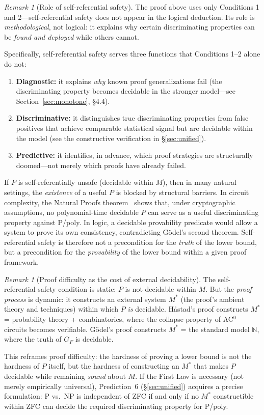 \documentclass[11pt,a4paper]{article}
\theoremstyle{plain}
\theoremstyle{definition}
\theoremstyle{remark}
\newtheorem{remark}[theorem]{Remark}
\begin{document}
\begin{remark}[Role of self-referential safety]
The proof above uses only Conditions 1 and 2---self-referential safety does not appear in the logical deduction. Its role is \emph{methodological}, not logical: it explains why certain discriminating properties can be \emph{found and deployed} while others cannot.

Specifically, self-referential safety serves three functions that Conditions 1--2 alone do not:
\begin{enumerate}[label=(\alph*)]
\item \textbf{Diagnostic:} it explains \emph{why} known proof generalizations fail (the discriminating property becomes decidable in the stronger model---see Section~\ref{sec:monotone}, \S4.4).
\item \textbf{Discriminative:} it distinguishes true discriminating properties from false positives that achieve comparable statistical signal but are decidable within the model (see the constructive verification in \S\ref{sec:unified}).
\item \textbf{Predictive:} it identifies, in advance, which proof strategies are structurally doomed---not merely which proofs have already failed.
\end{enumerate}

If $P$ is self-referentially unsafe (decidable within $M$), then in many natural settings, the \emph{existence} of a useful $P$ is blocked by structural barriers. In circuit complexity, the Natural Proofs theorem~\cite{RazborovRudich1994} shows that, under cryptographic assumptions, no polynomial-time decidable $P$ can serve as a useful discriminating property against P/poly. In logic, a decidable provability predicate would allow a system to prove its own consistency, contradicting G\"{o}del's second theorem. Self-referential safety is therefore not a precondition for the \emph{truth} of the lower bound, but a precondition for the \emph{provability} of the lower bound within a given proof framework.
\end{remark}

\begin{remark}[Proof difficulty as the cost of external decidability]
The self-referential safety condition is static: $P$ is not decidable within $M$. But the \emph{proof process} is dynamic: it constructs an external system $M^*$ (the proof's ambient theory and techniques) within which $P$ \emph{is} decidable. H\r{a}stad's proof constructs $M^*$ = probability theory + combinatorics, where the collapse property of AC$^0$ circuits becomes verifiable. G\"{o}del's proof constructs $M^*$ = the standard model $\mathbb{N}$, where the truth of $G_F$ is decidable.

This reframes proof difficulty: the hardness of proving a lower bound is not the hardness of $P$ itself, but the hardness of constructing an $M^*$ that makes $P$ decidable while remaining \emph{sound} about $M$. If the First Law is necessary (not merely empirically universal), Prediction~6 (\S\ref{sec:unified}) acquires a precise formulation: P vs.\ NP is independent of ZFC if and only if no $M^*$ constructible within ZFC can decide the required discriminating property for P/poly.
\end{remark}
\end{document}
